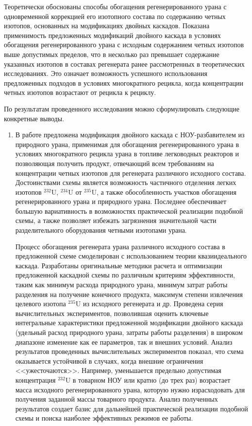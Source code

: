 Теоретически обоснованы способы обогащения регенерированного урана с одновременной коррекцией его изотопного состава по содержанию четных изотопов, основанных на модификациях двойных каскадов. Показана применимость предложенных модификаций двойного каскада в условиях обогащения регенерированного урана с исходным содержанием четных изотопов выше допустимых пределов, что в несколько раз превышает содержание указанных изотопов в составах регенерата ранее рассмотренных в теоретических исследованиях. Это означает возможность успешного использования предложенных подходов в условиях многократного рецикла, когда концентрации четных изотопов возрастают от рецикла к рециклу.

По результатам проведенного исследования можно сформулировать следующие конкретные выводы.

\begin{enumerate}
\item В работе предложена модификация двойного каскада с НОУ-разбавителем из природного урана, применимая для обогащения регенерированного урана в условиях многократного рецикла урана в топливе легководных реакторов и позволяющая получить продукт, отвечающий всем требованиям на концентрации четных изотопов для регенерата различного исходного состава. Достоинствами схемы является возможность частичного отделения легких изотопов $^{232}$U, $^{234}$U от $^{235}$U, а также обособленность участков обогащения регенерированного урана и природного урана. Последнее обеспечивает большую вариативность в возможностях практической реализации подобной схемы, а также позволяет избежать загрязнения значительной части разделительного оборудования четными изотопами урана.


Процесс обогащения регенерата урана различного исходного состава в предложенной схеме смоделирован с использованием теории квазиидеального каскада. Разработаны оригинальные методики расчета и оптимизации предложенной каскадной схемы по различным критериям эффективности, таким как минимум расхода природного урана, минимум затрат работы разделения на получение конечного продукта, максимум степени извлечения целевого изотопа $^{235}$U из исходного регенерата и др. Проведена серия вычислительных экспериментов, позволившая оценить ключевые интегральные характеристики предложенной модификации двойного каскада (удельный расход природного урана, затраты работы разделения) в широком диапазоне изменение как ее параметров, так и внешних условий. Анализ результатов проведенных вычислительных экспериментов показал, что схема оказывается устойчивой в случаях, когда внешние ограничения <<ужесточаются>>. Например, уменьшается предельно допустимая концентрация $^{232}$U в товарном НОУ или кратно (до трех раз) возрастает масса исходного регенерированного урана, которую нужно израсходовать для получения заданной массы товарного продукта. Анализ полученных результатов создает базис для дальнейшей практической реализации подобной схемы и поиска наиболее эффективных режимов ее работы.


\end{enumerate}
